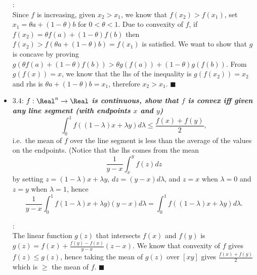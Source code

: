 \begin{itemize}
   \Proof: \\ Since $f$ is increasing, given $x_2 > x_1$, we know that $f(x_2)>f(x_1)$, set $x_1=
\theta a + (1-\theta) b$ for $0< \theta< 1$.  Due to convexity of $f$, if $f(x_2)= \theta f(a) +
(1-\theta) f(b)$ then $f(x_2) > f(\theta a + (1-\theta) b)= f(x_1)$ is satisfied.  We want to show
that $g$ is concave by proving $g(\theta f(a) + (1-\theta) f(b)) > \theta g(f(a)) + (1-\theta)
g(f(b))$.  From $g(f(x))=x$, we know that the lhs of the inequality is $g(f(x_2))= x_2$ and rhs is
$\theta a + (1-\theta) b= x_1$, therefore $x_2>x_1$.  $\blacksquare$

\item 3.4: {\bf\emph{$f: \Real^n \rightarrow \Real$ is continuous, show that $f$ is convex iff given
any line segment (with endpoints $x$ and $y$)}} \\ 
\begin{equation*} \int_0^1 f((1- \lambda)x+
   \lambda y) d\lambda \le \frac{f(x)+ f(y)}{2}, 
\end{equation*} 
i.e.\, the mean of $f$ over the line
segment is less than the average of the values on the endpoints.  (Notice that the lhs comes from the mean 
\begin{equation*} 
   \frac{1}{y-x}\int_x^y f(z) dz 
\end{equation*} 
by setting $z=(1-\lambda)x+
\lambda y$, $dz= (y-x)d\lambda$, and $z=x$ when $\lambda=0$ and $z=y$ when $\lambda=1$, hence
\begin{equation*} 
   \frac{1}{y-x}\int_0^1 f(1-\lambda)x+ \lambda y) (y-x) d\lambda = \int_0^1 f((1-\lambda)x+ \lambda y) d\lambda. 
\end{equation*}

   \Proof: \\ The linear function $g(z)$ that intersects $f(x)$ and $f(y)$ is $g(z) =
f(x)+\frac{f(y)-f(x)}{y-x}(z-x)$.  We know that convexity of $f$ gives $f(z)\le g(z)$, hence taking
the mean of $g(z)$ over $[x y]$ gives $\frac{f(x)+f(y)}{2}$ which is $\ge$ the mean of $f$.
$\blacksquare$


\end{itemize}

